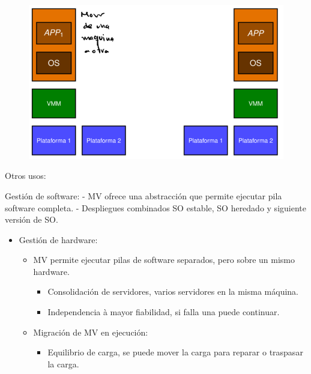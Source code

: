\documentclass[12pt, twoside, openright]{report} %
\begin{document}
\begin{itemize}
\begin{figure}[H]
        {\includegraphics[scale=.3]{Untitled 35.png}}
      \end{figure}
    \end{itemize}

    Otros usos:

    Gestión de software: - MV ofrece una abstracción que permite
    ejecutar pila software completa. - Despliegues combinados SO
    estable, SO heredado y siguiente versión de SO.

    \begin{itemize}
    
    \item
      Gestión de hardware:

      \begin{itemize}
      
      \item
        MV permite ejecutar pilas de software separados, pero sobre un
        mismo hardware.

        \begin{itemize}
        
        \item
          Consolidación de servidores, varios servidores en la misma
          máquina.
        \item
          Independencia à mayor fiabilidad, si falla una puede
          continuar.
        \end{itemize}
      \item
        Migración de MV en ejecución:

        \begin{itemize}
        
        \item
          Equilibrio de carga, se puede mover la carga para reparar o
          traspasar la carga.
        \end{itemize}
      \end{itemize}
    \end{itemize}
\end{document}
